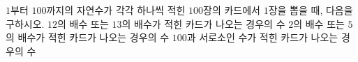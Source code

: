 $1$부터 $100$까지의 자연수가 각각 하나씩 적힌 $100$장의 카드에서 $1$장을 뽑을 때, 다음을 구하시오.
 $12$의 배수 또는 $13$의 배수가 적힌 카드가 나오는 경우의 수
 $2$의 배수 또는 $5$의 배수가 적힌 카드가 나오는 경우의 수
 $100$과 서로소인 수가 적힌 카드가 나오는 경우의 수
